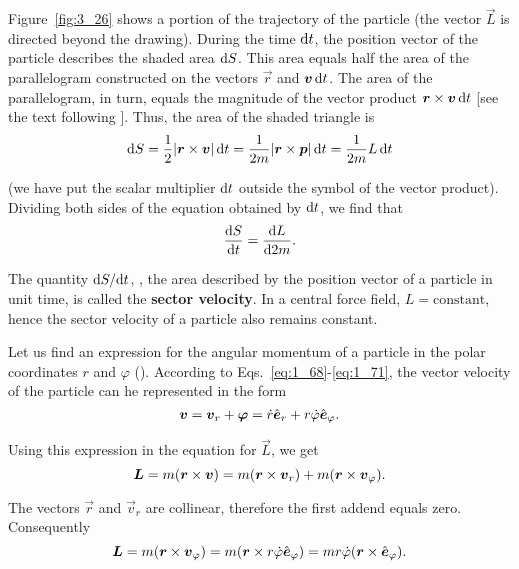 Figure~\ref{fig:3_26} shows a portion of the trajectory of the particle (the vector $\vec{L}$ is directed beyond the drawing). During the time $\mathrm{d} t$, the position vector of the particle describes the shaded area $\mathrm{d} S$. This area equals half the area of the parallelogram constructed on the vectors $\vec{r}$ and $\boldsymbol{v}\,\mathrm{d} t$. The area of the parallelogram, in turn, equals the magnitude of the vector product $\boldsymbol{r}\times\boldsymbol{v}\,\mathrm{d} t$ [see the text following ]. Thus, the area of the shaded triangle is
\begin{equation*}
\mathrm{d} S = \frac{1}{2}|\boldsymbol{r}\times\boldsymbol{v}|\,\mathrm{d} t = \frac{1}{2m}|\boldsymbol{r}\times\boldsymbol{p}|\,\mathrm{d} t = \frac{1}{2m}L\,\mathrm{d} t
\end{equation*}

\noindent
(we have put the scalar multiplier $\mathrm{d} t$ outside the symbol of the vector product). Dividing both sides of the equation obtained by $\mathrm{d} t$, we find that
\begin{equation}\label{eq:3_121}
\frac{\mathrm{d} S}{\mathrm{d} t} = \frac{\mathrm{d} L}{\mathrm{d}2m}.
\end{equation}

The quantity $\mathrm{d} S/\mathrm{d} t$, \ie, the area described by the position vector of a particle in unit time, is called the \textbf{sector velocity}. In a central force field, $L=\text{constant}$, hence the sector velocity of a particle also remains constant.

Let us find an expression for the angular momentum of a particle in the polar coordinates $r$ and $\varphi$ (). According to Eqs.~\eqref{eq:1_68}-\eqref{eq:1_71}, the vector velocity of the particle can he represented in the form
\begin{equation}\label{eq:3_122}
\boldsymbol{v} = \boldsymbol{v}_r + \boldsymbol{\varphi} = \dot{r}\hat{\boldsymbol{e}}_{r} + r\dot{\varphi}\hat{\boldsymbol{e}}_{\varphi}.
\end{equation}

\noindent
Using this expression in the equation for $\vec{L}$, we get
\begin{equation*}
\boldsymbol{L} = m(\boldsymbol{r}\times\boldsymbol{v}) = m(\boldsymbol{r}\times\boldsymbol{v}_r) + m(\boldsymbol{r}\times\boldsymbol{v}_{\varphi}).
\end{equation*}

\noindent
The vectors $\vec{r}$ and $\vec{v}_r$ are collinear, therefore the first addend equals zero. Consequently
\begin{equation*}
\boldsymbol{L} = m(\boldsymbol{r}\times\boldsymbol{v}_{\varphi}) = m(\boldsymbol{r}\times r\dot{\varphi}\hat{\boldsymbol{e}}_{\varphi}) = mr\dot{\varphi}(\boldsymbol{r}\times\hat{\boldsymbol{e}}_{\varphi}).
\end{equation*}

